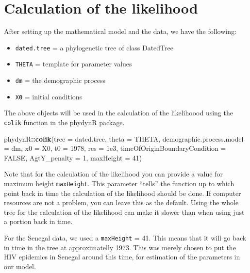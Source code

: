 \documentclass[12pt,]{article}
\newenvironment{Shaded}{\begin{snugshade}}{\end{snugshade}}
\newcommand{\DataTypeTok}[1]{\textcolor[rgb]{0.13,0.29,0.53}{#1}}
\newcommand{\DecValTok}[1]{\textcolor[rgb]{0.00,0.00,0.81}{#1}}
\newcommand{\FloatTok}[1]{\textcolor[rgb]{0.00,0.00,0.81}{#1}}
\newcommand{\KeywordTok}[1]{\textcolor[rgb]{0.13,0.29,0.53}{\textbf{#1}}}
\newcommand{\NormalTok}[1]{#1}
\newcommand{\OperatorTok}[1]{\textcolor[rgb]{0.81,0.36,0.00}{\textbf{#1}}}
\newcommand{\OtherTok}[1]{\textcolor[rgb]{0.56,0.35,0.01}{#1}}
\providecommand{\tightlist}{%
  \setlength{\itemsep}{0pt}\setlength{\parskip}{0pt}}
\begin{document}
\hypertarget{calculation-of-the-likelihood}{%
\section{Calculation of the
likelihood}\label{calculation-of-the-likelihood}}

After setting up the mathematical model and the data, we have the
following:

\begin{itemize}
\tightlist
\item
  \texttt{dated.tree} = a phylogenetic tree of class DatedTree
\item
  \texttt{THETA} = template for parameter values
\item
  \texttt{dm} = the demographic process
\item
  \texttt{X0} = initial conditions
\end{itemize}

The above objects will be used in the calculation of the likelihoood
using the \texttt{colik} function in the phydynR package.

\begin{Shaded}
\begin{Highlighting}[]
\NormalTok{phydynR}\OperatorTok{::}\KeywordTok{colik}\NormalTok{(}\DataTypeTok{tree =}\NormalTok{ dated.tree,}
               \DataTypeTok{theta =}\NormalTok{ THETA,}
               \DataTypeTok{demographic.process.model =}\NormalTok{ dm,}
               \DataTypeTok{x0 =}\NormalTok{ X0,}
               \DataTypeTok{t0 =} \DecValTok{1978}\NormalTok{,}
               \DataTypeTok{res =} \FloatTok{1e3}\NormalTok{,}
               \DataTypeTok{timeOfOriginBoundaryCondition =} \OtherTok{FALSE}\NormalTok{,}
               \DataTypeTok{AgtY_penalty =} \DecValTok{1}\NormalTok{,}
               \DataTypeTok{maxHeight =} \DecValTok{41}\NormalTok{)}
\end{Highlighting}
\end{Shaded}

Note that for the calculation of the likelihood you can provide a value
for maximum height \texttt{maxHeight}. This parameter ``tells'' the
function up to which point back in time the calculation of the
likelihood should be done. If computer resources are not a problem, you
can leave this as the default. Using the whole tree for the calculation
of the likelihood can make it slower than when using just a portion back
in time.

For the Senegal data, we used a \texttt{maxHeight} = 41. This means that
it will go back in time in the tree at approximatelly 1973. This was
merely chosen to put the HIV epidemics in Senegal around this time, for
estimation of the parameters in our model.
\end{document}
